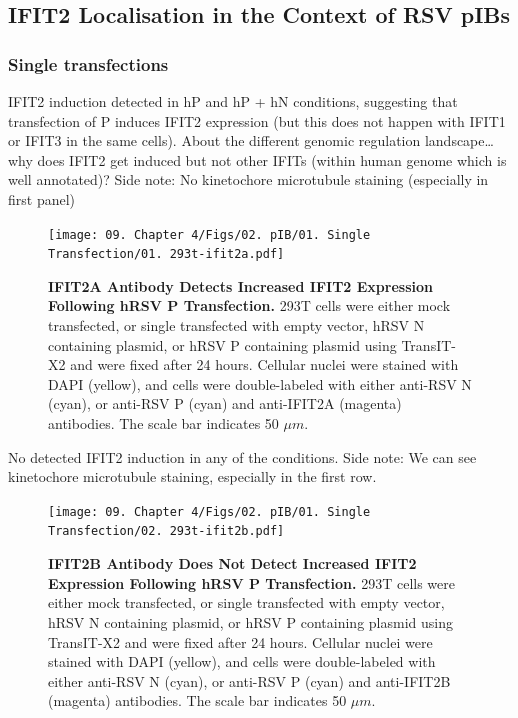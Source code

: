 \subsection{IFIT2 Localisation in the Context of RSV pIBs} \label{subsec:IFIT2 Localisation in the Context of RSV pIBs}
\subsubsection{Single transfections}
IFIT2 induction detected in hP and hP + hN conditions, suggesting that transfection of P induces IFIT2 expression (but this does not happen with IFIT1 or IFIT3 in the same cells).
About the different genomic regulation landscape… why does IFIT2 get induced but not other IFITs (within human genome which is well annotated)? 
Side note: No kinetochore microtubule staining (especially in first panel)

\begin{figure}
    \centering
    \texttt{[image: 09. Chapter 4/Figs/02. pIB/01. Single Transfection/01. 293t-ifit2a.pdf]}
    \caption[IFIT2A Antibody Detects Increased IFIT2 Expression Following hRSV P Transfection.]{\textbf{IFIT2A Antibody Detects Increased IFIT2 Expression Following hRSV P Transfection.} 293T cells were either mock transfected, or single transfected with empty vector, hRSV N containing plasmid, or hRSV P containing plasmid using TransIT-X2 and were fixed after 24 hours. Cellular nuclei were stained with DAPI (yellow), and cells were double-labeled with either anti-RSV N (cyan), or anti-RSV P (cyan) and anti-IFIT2A (magenta) antibodies. The scale bar indicates 50 \(\mu m\).}
    \label{fig:IFIT2A Antibody Detects Increased IFIT2 Expression Following hRSV P Transfection}
\end{figure}

No detected IFIT2 induction in any of the conditions.
Side note: We can see kinetochore microtubule staining, especially in the first row.

\begin{figure}
    \centering
    \texttt{[image: 09. Chapter 4/Figs/02. pIB/01. Single Transfection/02. 293t-ifit2b.pdf]}
    \caption[IFIT2B Antibody Does Not Detect Increased IFIT2 Expression Following hRSV P Transfection.]{\textbf{IFIT2B Antibody Does Not Detect Increased IFIT2 Expression Following hRSV P Transfection.} 293T cells were either mock transfected, or single transfected with empty vector, hRSV N containing plasmid, or hRSV P containing plasmid using TransIT-X2 and were fixed after 24 hours. Cellular nuclei were stained with DAPI (yellow), and cells were double-labeled with either anti-RSV N (cyan), or anti-RSV P (cyan) and anti-IFIT2B (magenta) antibodies. The scale bar indicates 50 \(\mu m\).}
    \label{fig:IFIT2B Antibody Does Not Detect Increased IFIT2 Expression Following hRSV P Transfection}
\end{figure}

